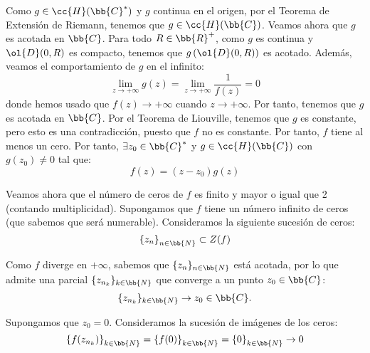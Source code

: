 \documentclass[12pt]{article}
\begin{document}
\begin{ejercicio}[2.5 + 1.5 puntos]
\begin{description}
                Como $g\in \cc{H}(\bb{C}^*)$ y $g$ continua en el origen, por el Teorema de Extensión de Riemann, tenemos que $g\in \cc{H}(\bb{C})$. Veamos ahora que $g$ es acotada en $\bb{C}$. Para todo $R\in \bb{R}^+$, como $g$ es continua y $\ol{D}(0, R)$ es compacto, tenemos que $g\left(\ol{D}(0, R)\right)$ es acotado. Además, veamos el comportamiento de $g$ en el infinito:
                \begin{equation*}
                    \lim_{z\to +\infty} g(z) = \lim_{z\to +\infty} \frac{1}{f(z)} = 0
                \end{equation*}
                donde hemos usado que $f(z) \to +\infty$ cuando $z\to +\infty$. Por tanto, tenemos que $g$ es acotada en $\bb{C}$. Por el Teorema de Liouville, tenemos que $g$ es constante, pero esto es una contradicción, puesto que $f$ no es constante. Por tanto, $f$ tiene al menos un cero. Por tanto, $\exists z_0\in \bb{C}^*$ y $g\in \cc{H}(\bb{C})$ con $g(z_0)\neq 0$ tal que:
                \begin{equation*}
                    f(z)=(z-z_0)g(z)
                \end{equation*}
        
                Veamos ahora que el número de ceros de $f$ es finito y mayor o igual que 2 (contando multiplicidad). Supongamos que $f$ tiene un número infinito de ceros (que sabemos que será numerable). Consideramos la siguiente sucesión de ceros:
                \begin{equation*}
                    \left\{z_n\right\}_{n\in\bb{N}}\subset Z(f)
                \end{equation*}
        
                Como $f$ diverge en $+\infty$, sabemos que $\{z_n\}_{n\in\bb{N}}$ está acotada, por lo que admite una parcial $\{z_{n_k}\}_{k\in\bb{N}}$ que converge a un punto $z_0\in \bb{C}$:
                \begin{equation*}
                    \{z_{n_k}\}_{k\in\bb{N}}\to z_0\in \bb{C}.
                \end{equation*}
        
                Supongamos que $z_0=0$. Consideramos la sucesión de imágenes de los ceros:
                \begin{equation*}
                    \left\{f(z_{n_k})\right\}_{k\in\bb{N}} = \left\{f(0)\right\}_{k\in\bb{N}} = \left\{0\right\}_{k\in\bb{N}}\to 0
                \end{equation*}
        

\end{description}
\end{ejercicio}
\end{document}
